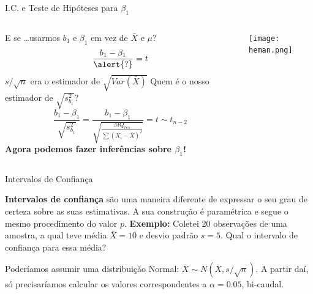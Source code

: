 \documentclass{beamer}\usepackage[]{graphicx}\usepackage[]{color}
\begin{document}
\begin{frame}{I.C. e Teste de Hipóteses para $\beta _1$}

\begin{columns}[c]

\begin{small}
E se \ldots usarmos $b_1$ e $\beta _1$ em vez de $\bar X$ e $\mu$? \pause
\vfill
\begin{equation*}
\frac{b_1 - \beta _1}{\alert{?}} = t
\end{equation*} \pause
\vfill
$s / \sqrt{n}$ era o estimador de $\sqrt{Var(\bar X)}$
Quem é o nosso estimador de $\sqrt{s^2_{b_1}}$? \pause 
\begin{equation*}
\frac{b_1 - \beta _1}{\sqrt{s^2_{b_1}}} =  \frac{b_1 - \beta _1}{\sqrt{\frac{MQ_{res}}{\sum (X_i-\bar X)^2}}} = t \sim t_{n-2}
\end{equation*} \pause
\vfill
\textbf{Agora podemos fazer inferências sobre $\beta _1$!}
\end{small}

\texttt{[image: heman.png]}

\end{columns}

\end{frame}


\begin{frame}{Intervalos de Confiança}

\begin{small}

\textbf{Intervalos de confiança }são uma maneira diferente de expressar o seu grau de certeza sobre as suas estimativas. A sua construção é paramétrica e segue o mesmo procedimento do valor $p$.
\vfill
\alert{\textbf{Exemplo:}} Coletei 20 observações de uma amostra, a qual teve média $\bar{X} = 10$ e desvio padrão $s = 5$. Qual o intervalo de confiança para essa média? \pause


Poderíamos assumir uma distribuição Normal: $\bar{X} \sim N(\bar{X},s/\sqrt{n})$. A partir daí, só precisaríamos calcular os valores correspondentes a $\alpha = 0.05$, bi-caudal.

\end{small}

\end{frame}
\end{document}
